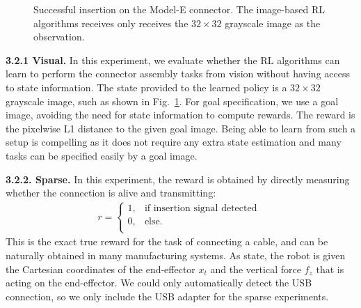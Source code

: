 \begin{figure}
{\begin{subfigure}[b]{0.24\linewidth}
        \centering
    \end{subfigure}   
     }
    \caption{Successful insertion on the Model-E connector. The image-based RL algorithms receives only receives the $32\times32$ grayscale image as the observation.
    }
    \label{fig:vision_insertion_sequence}
\end{figure}

\textbf{3.2.1 Visual. } In this experiment, we evaluate whether the RL algorithms can learn to perform the connector assembly tasks from vision without having access to state information. The state provided to the learned policy is a $32 \times 32$ grayscale image, such as shown in Fig.~\ref{fig:vision_insertion_sequence}.
For goal specification, we use a goal image, avoiding the need for state information to compute rewards. The reward is the pixelwise L1 distance to the given goal image. Being able to learn from such a setup is compelling as it does not require any extra state estimation and many tasks can be specified easily by a goal image.

\textbf{3.2.2. Sparse. } In this experiment, the reward is obtained by directly measuring whether the connection is alive and transmitting:
\begin{align}
 r  = 
  \begin{cases}
    1, & \text{if insertion signal detected } \\
    0, & \text{else. } \\
  \end{cases}
\end{align}
This is the exact true reward for the task of connecting a cable, and can be naturally obtained in many manufacturing systems. As state, the robot is given the Cartesian coordinates of the end-effector $x_t$ and the vertical force $f_z$ that is acting on the end-effector. We could only automatically detect the USB connection, so we only include the USB adapter for the sparse experiments. 

